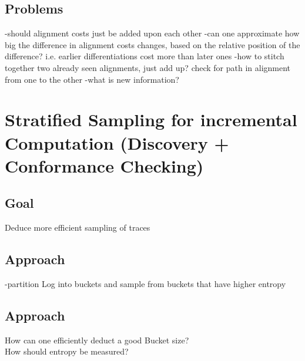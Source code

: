 \documentclass[]{article}
\begin{document}
\subsection{Problems}
-should alignment costs just be added upon each other
-can one approximate how big the difference in alignment costs changes, based on the relative position of the difference? i.e. earlier differentiations cost more than later ones
-how to stitch together two already seen alignments, just add up? check for path in alignment from one to the other
-what is new information?
\newpage
\section{Stratified Sampling for incremental Computation (Discovery + Conformance Checking)}
\subsection{Goal}
Deduce more efficient sampling of traces

\subsection{Approach}
-partition Log into buckets and sample from buckets that have higher entropy\\

\subsection{Approach}
How can one efficiently deduct a good Bucket size?\\
How should entropy be measured?
\end{document}
